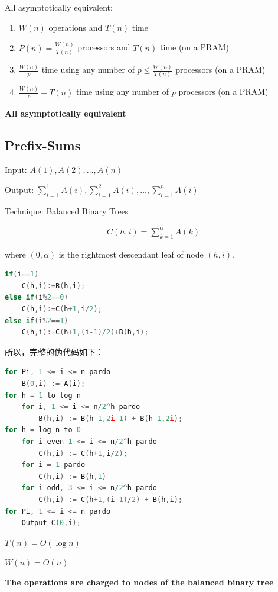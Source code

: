 \documentclass{article}
\begin{document}
All asymptotically equivalent:
\begin{enumerate}\small
    \item  $W(n)$ operations and $T(n)$ time
    \item $P(n) = \frac{W(n)}{T(n)}$ processors and $T(n)$ time (on a PRAM)
    \item $\frac{W(n)}{p}$ time using any number of $p \le \frac{W(n)}{T(n)}$ processors (on a PRAM)
    \item $\frac{W(n)}{p} + T(n)$ time using any number of $p$ processors (on a PRAM)
\end{enumerate}

\textbf{All asymptotically equivalent}

\subsection{Prefix-Sums}
Input:  $A(1), A(2), \dots, A(n)$

Output: $\displaystyle \sum_{i=1}^1A(i), \sum_{i=1}^2A(i), \dots, \sum_{i=1}^nA(i)$

Technique: Balanced Binary Trees

\begin{align*}
    C(h,i)=\sum_{k=1}^\alpha A(k)
\end{align*}

where $(0, \alpha)$ is the rightmost descendant leaf of node $(h,i)$. 

\begin{lstlisting}[language={c}]
if(i==1)
    C(h,i):=B(h,i);
else if(i%2==0)
    C(h,i):=C(h+1,i/2);
else if(i%2==1)
    C(h,i):=C(h+1,(i-1)/2)+B(h,i);
\end{lstlisting}

所以，完整的伪代码如下：

\begin{lstlisting}[language = {c}]
for Pi, 1 <= i <= n pardo
    B(0,i) := A(i);
for h = 1 to log n
    for i, 1 <= i <= n/2^h pardo
        B(h,i) := B(h-1,2i-1) + B(h-1,2i);
for h = log n to 0
    for i even 1 <= i <= n/2^h pardo
        C(h,i) := C(h+1,i/2);
    for i = 1 pardo
        C(h,i) := B(h,1)
    for i odd, 3 <= i <= n/2^h pardo
        C(h,i) := C(h+1,(i-1)/2) + B(h,i);
for Pi, 1 <= i <= n pardo
    Output C(0,i);
\end{lstlisting}

$T(n) = O(\log n)$

$W(n) = O(n)$

\textbf{The operations are charged to nodes of the balanced binary tree}
\end{document}
